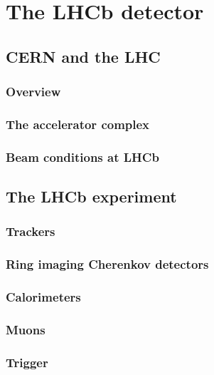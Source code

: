 \chapter{The LHCb detector} 
\label{ch:detector}
\minitoc
 


\section{CERN and the LHC}

\subsection{Overview}
\subsection{The accelerator complex}
\subsection{Beam conditions at LHCb}

\section{The LHCb experiment}

\subsection{Trackers}
\subsection{Ring imaging Cherenkov detectors}
\subsection{Calorimeters}
\subsection{Muons}
\subsection{Trigger}